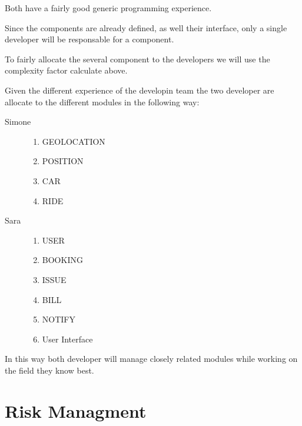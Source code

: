 \documentclass[11pt]{article} %
\begin{document}
Both have a fairly good generic programming experience.

Since the components are already defined, as well their interface, only a single developer will be responsable for a component.

To fairly allocate the several component to the developers we will use the complexity factor calculate above.

Given the different experience of the developin team the two developer are allocate to the different modules in the following way:

\begin{description}
	\item[Simone] \hfill
		\begin{enumerate}
			\item GEOLOCATION
			\item POSITION
			\item CAR
			\item RIDE
		\end{enumerate}
	\item[Sara] \hfill
		\begin{enumerate}
			\item USER
			\item BOOKING
			\item ISSUE
			\item BILL
			\item NOTIFY
			\item User Interface
		\end{enumerate}
\end{description}

In this way both developer will manage closely related modules while working on the field they know best.

\begin{comment}
L = 3
A = 4
H = 6

USER -> 11
GEOLOCATION -> 15
POSITION ->10
BOOKING -> 10
CAR -> 25
RIDE -> 6 + 3
ISSUE -> 13
BILL -> 13
NOTIFY -> 5

SIMO -> GEOLOCATION + POSITION + CAR + RIDE = 15 + 10 + 25 + 9 = 59
SARA -> USER + BOOKING + ISSUE + BILL + NOTIFY = 11 + 10 + 13 + 13 + 5 = 52
\end{comment}

\section{Risk Managment}
\end{document}
